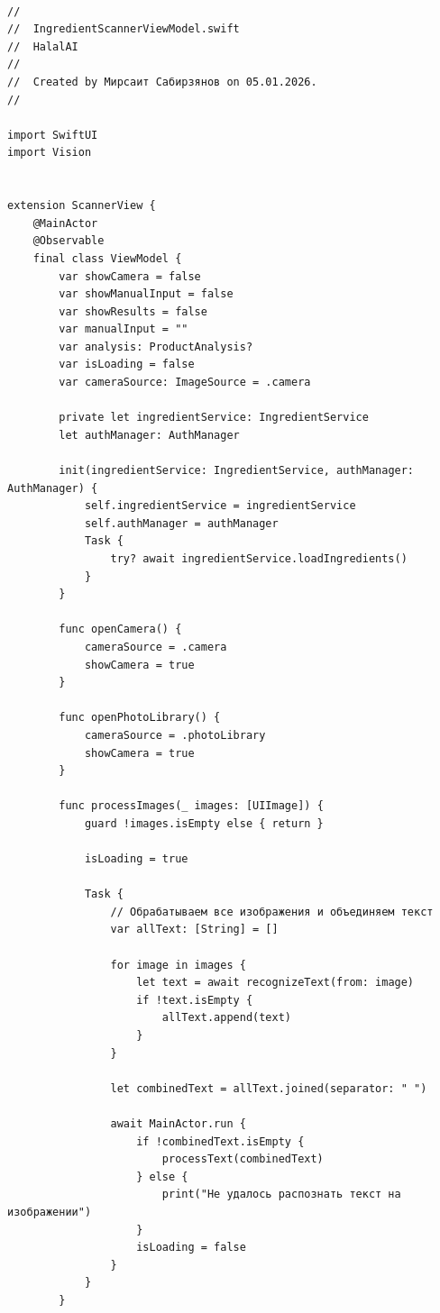 \begin{lstlisting}[basicstyle=\tiny\ttfamily,breaklines=true]

//
//  IngredientScannerViewModel.swift
//  HalalAI
//
//  Created by Мирсаит Сабирзянов on 05.01.2026.
//

import SwiftUI
import Vision


extension ScannerView {
    @MainActor
    @Observable
    final class ViewModel {
        var showCamera = false
        var showManualInput = false
        var showResults = false
        var manualInput = ""
        var analysis: ProductAnalysis?
        var isLoading = false
        var cameraSource: ImageSource = .camera
        
        private let ingredientService: IngredientService
        let authManager: AuthManager

        init(ingredientService: IngredientService, authManager: AuthManager) {
            self.ingredientService = ingredientService
            self.authManager = authManager
            Task {
                try? await ingredientService.loadIngredients()
            }
        }
        
        func openCamera() {
            cameraSource = .camera
            showCamera = true
        }

        func openPhotoLibrary() {
            cameraSource = .photoLibrary
            showCamera = true
        }

        func processImages(_ images: [UIImage]) {
            guard !images.isEmpty else { return }
            
            isLoading = true
            
            Task {
                // Обрабатываем все изображения и объединяем текст
                var allText: [String] = []
                
                for image in images {
                    let text = await recognizeText(from: image)
                    if !text.isEmpty {
                        allText.append(text)
                    }
                }
                
                let combinedText = allText.joined(separator: " ")
                
                await MainActor.run {
                    if !combinedText.isEmpty {
                        processText(combinedText)
                    } else {
                        print("Не удалось распознать текст на изображении")
                    }
                    isLoading = false
                }
            }
        }
        

\end{lstlisting}
